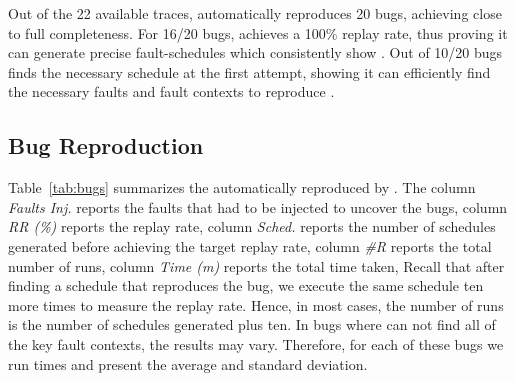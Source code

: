 

 Out of the 22 available traces, \sys automatically reproduces 20 bugs, achieving close to full completeness.
For 16/20 bugs, \sys achieves a 100\% replay rate, thus proving it can generate precise fault-schedules which consistently show \efib.
Out of 10/20 bugs \sys finds the necessary schedule at the first attempt, showing it can efficiently find the necessary faults and fault contexts to reproduce \efib.



\subsection{Bug Reproduction}



Table~\ref{tab:bugs} summarizes the \efib automatically reproduced by \sys.
The column \emph{Faults Inj.} reports the faults that had to be injected to uncover the bugs, column \emph{RR (\%)} reports the replay rate, column \emph{Sched.} reports the number of schedules generated before achieving the target replay rate, column \emph{\#R} reports the total number of runs, column \emph{Time (m)} reports the total time taken, 
Recall that after finding a schedule that reproduces the bug, we execute the same schedule ten more times to measure the replay rate.
Hence, in most cases, the number of runs is the number of schedules generated plus ten.
In bugs where \sys can not find all of the key fault contexts, the results may vary. Therefore, for each of these bugs we run  times and present the average and standard deviation.

